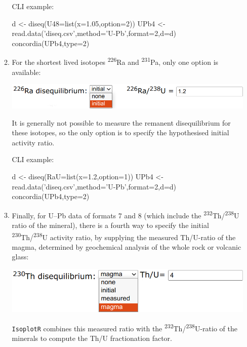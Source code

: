 \begin{refsection}
\begin{enumerate}
\begin{enumerate}
\noindent CLI example:
\begin{script}
d <- diseq(U48=list(x=1.05,option=2))
UPb4 <- read.data('diseq.csv',method='U-Pb',format=2,d=d)
concordia(UPb4,type=2)
\end{script}

\item For the shortest lived isotopes \textsuperscript{226}Ra and
  \textsuperscript{231}Pa, only one option is available:
  
\noindent\begin{minipage}[t]{.6\linewidth}
  \strut\vspace*{-\baselineskip}\newline
  \includegraphics[width=\linewidth]{../figures/Ra226-disequilibrium.png}
\end{minipage}
\begin{minipage}[t]{.4\linewidth}
It is generally not possible to measure the remanent disequilibrium
for these isotopes, so the only option is to specify the hypothesised
initial activity ratio.
\end{minipage}

\noindent CLI example:
\begin{script}
d <- diseq(RaU=list(x=1.2,option=1))
UPb4 <- read.data('diseq.csv',method='U-Pb',format=2,d=d)
concordia(UPb4,type=2)
\end{script}

\item Finally, for U--Pb data of formats 7 and 8 (which include the
  \textsuperscript{232}Th/\textsuperscript{238}U ratio of the
  mineral), there is a fourth way to specify the initial
  \textsuperscript{230}Th/\textsuperscript{238}U activity ratio, by
  supplying the measured Th/U-ratio of the magma, determined by
  geochemical analysis of the whole rock or volcanic glass:

\noindent\begin{minipage}[t]{.6\linewidth}
    \strut\vspace*{-\baselineskip}\newline
    \includegraphics[width=\linewidth]{../figures/Th230-disequilibrium.png}
  \end{minipage}
  \begin{minipage}[t]{.4\linewidth}
    \texttt{IsoplotR} combines this measured ratio with the
    \textsuperscript{232}Th/\textsuperscript{238}U-ratio of the
    minerals to compute the Th/U fractionation factor.
  \end{minipage}


\end{enumerate}
\end{enumerate}
\end{refsection}
